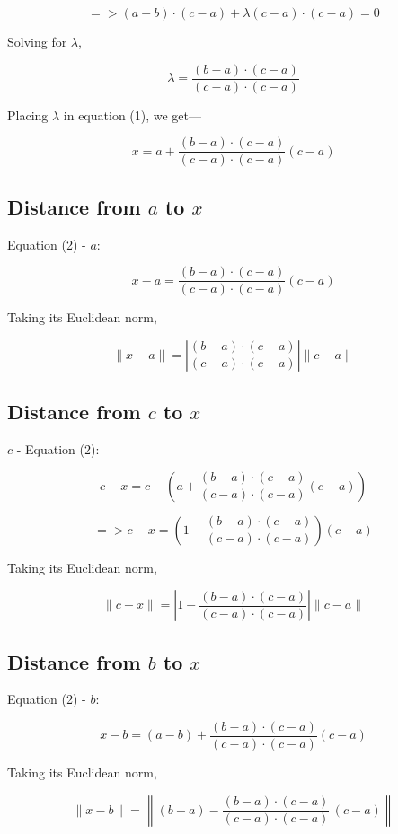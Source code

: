 \documentclass{article}
\begin{document}
\begin{enumerate}
\[
=> (a - b) \cdot (c - a) + \lambda (c - a) \cdot (c - a) = 0
\]

Solving for \(\lambda\),

\[
\lambda = \frac{(b - a) \cdot (c - a)}{(c - a) \cdot (c - a)}
\]

Placing \(\lambda\) in equation (1), we get—

\begin{equation}
x = a + \frac{(b - a) \cdot (c - a)}{(c - a) \cdot (c - a)} (c - a)
\label{eq:x_projection}
\end{equation}


\subsection*{Distance from \(a\) to \(x\)}

Equation (2) - \(a\):

\[
x - a = \frac{(b - a) \cdot (c - a)}{(c - a) \cdot (c - a)} (c - a)
\]

Taking its Euclidean norm,

\[
\boxed{\|x - a\| = \left|\frac{(b - a) \cdot (c - a)}{(c - a) \cdot (c - a)}\right| \|c - a\|}
\]

\subsection*{Distance from \(c\) to \(x\)}

\(c\) - Equation (2):

\[
c - x = c - \left(a + \frac{(b - a) \cdot (c - a)}{(c - a) \cdot (c - a)} (c - a) \right)
\]

\[
=> c - x = \left(1 - \frac{(b - a) \cdot (c - a)}{(c - a) \cdot (c - a)} \right) (c - a)
\]

Taking its Euclidean norm,

\[
\boxed{\|c - x\| = \left|1 - \frac{(b - a) \cdot (c - a)}{(c - a) \cdot (c - a)}\right| \|c - a\|}
\]

\subsection*{Distance from \(b\) to \(x\)}

Equation (2) - \(b\):

\[
x - b = (a - b) + \frac{(b - a) \cdot (c - a)}{(c - a) \cdot (c - a)} (c - a)
\]

Taking its Euclidean norm,

\[
\boxed{\|x - b\| = \left\|(b - a) - \frac{(b - a) \cdot (c - a)}{(c - a) \cdot (c - a)}\, (c - a)\right\|}
\]




\end{enumerate}
\end{document}
